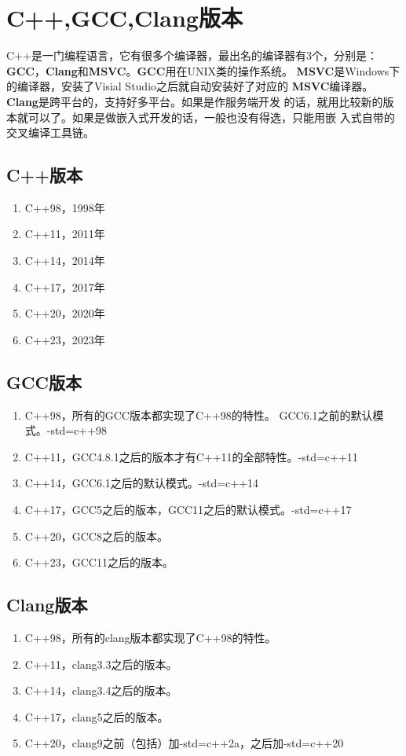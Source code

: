 \chapter{C++,GCC,Clang版本}

C++是一门编程语言，它有很多个编译器，最出名的编译器有3个，分别是：
\textbf{GCC}，\textbf{Clang}和\textbf{MSVC}。\textbf{GCC}用在UNIX类的操作系统。
\textbf{MSVC}是Windows下的编译器，安装了Visial Studio之后就自动安装好了对应的
\textbf{MSVC}编译器。\textbf{Clang}是跨平台的，支持好多平台。如果是作服务端开发
的话，就用比较新的版本就可以了。如果是做嵌入式开发的话，一般也没有得选，只能用嵌
入式自带的交叉编译工具链。

\section{C++版本}

\begin{enumerate}
  \item C++98，1998年
  \item C++11，2011年
  \item C++14，2014年
  \item C++17，2017年
  \item C++20，2020年
  \item C++23，2023年
\end{enumerate}

\section{GCC版本}

\begin{enumerate}
  \item C++98，所有的GCC版本都实现了C++98的特性。
    GCC6.1之前的默认模式。-std=c++98
  \item C++11，GCC4.8.1之后的版本才有C++11的全部特性。-std=c++11
  \item C++14，GCC6.1之后的默认模式。-std=c++14
  \item C++17，GCC5之后的版本，GCC11之后的默认模式。-std=c++17
  \item C++20，GCC8之后的版本。
  \item C++23，GCC11之后的版本。
\end{enumerate}

\section{Clang版本}

\begin{enumerate}
  \item C++98，所有的clang版本都实现了C++98的特性。
  \item C++11，clang3.3之后的版本。
  \item C++14，clang3.4之后的版本。
  \item C++17，clang5之后的版本。
  \item C++20，clang9之前（包括）加-std=c++2a，之后加-std=c++20
\end{enumerate}

